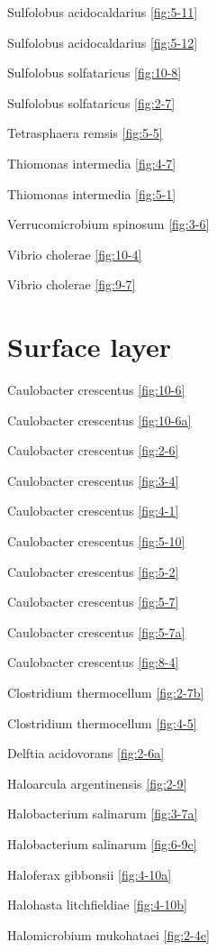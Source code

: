 \documentclass[]{tufte-book}
\begin{document}
Sulfolobus acidocaldarius \ref{fig:5-11}

Sulfolobus acidocaldarius \ref{fig:5-12}

Sulfolobus solfataricus \ref{fig:10-8}

Sulfolobus solfataricus \ref{fig:2-7}

Tetrasphaera remsis \ref{fig:5-5}

Thiomonas intermedia \ref{fig:4-7}

Thiomonas intermedia \ref{fig:5-1}

Verrucomicrobium spinosum \ref{fig:3-6}

Vibrio cholerae \ref{fig:10-4}

Vibrio cholerae \ref{fig:9-7}

\hypertarget{surface-layer-1}{%
\section*{Surface layer}\label{surface-layer-1}}

Caulobacter crescentus \ref{fig:10-6}

Caulobacter crescentus \ref{fig:10-6a}

Caulobacter crescentus \ref{fig:2-6}

Caulobacter crescentus \ref{fig:3-4}

Caulobacter crescentus \ref{fig:4-1}

Caulobacter crescentus \ref{fig:5-10}

Caulobacter crescentus \ref{fig:5-2}

Caulobacter crescentus \ref{fig:5-7}

Caulobacter crescentus \ref{fig:5-7a}

Caulobacter crescentus \ref{fig:8-4}

Clostridium thermocellum \ref{fig:2-7b}

Clostridium thermocellum \ref{fig:4-5}

Delftia acidovorans \ref{fig:2-6a}

Haloarcula argentinensis \ref{fig:2-9}

Halobacterium salinarum \ref{fig:3-7a}

Halobacterium salinarum \ref{fig:6-9c}

Haloferax gibbonsii \ref{fig:4-10a}

Halohasta litchfieldiae \ref{fig:4-10b}

Halomicrobium mukohataei \ref{fig:2-4e}
\end{document}
